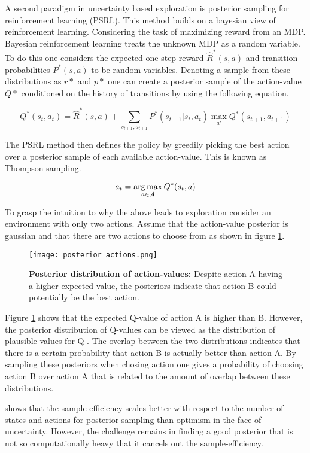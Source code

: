 A second paradigm in uncertainty based exploration is posterior sampling for reinforcement learning (PSRL). This method builds on a bayesian view of reinforcement learning. Considering the task of maximizing reward from an MDP. Bayesian reinforcement learning treats the unknown MDP as a random variable. To do this one considers the expected one-step reward $\hat{R}^*(s,a)$ and transition probabilities $P^*(s,a)$ to be random variables. Denoting a sample from these distributions as $r*$ and $p*$ one can create a posterior sample of the action-value $Q*$ conditioned on the history of transitions by using the following equation. 

\begin{equation}
 \label{eq:bayesian_bellman}
 Q^*(s_t,a_t) = \hat{R}^*(s,a) + \sum_{s_{t+1}, a_{t+1}}P^*(s_{t+1}|s_t,a_t)\max_{a'}Q^*(s_{t+1}, a_{t+1})
\end{equation}

The PSRL method then defines the policy by greedily picking the best action over a posterior sample of each available action-value. This is known as Thompson sampling. \citep{strens_2000}\citep{osband_2016}

\begin{equation}
a_t = \operatorname*{arg\,max}_{a\in\mathcal{A}} Q^*(s_t,a)
\end{equation}

To grasp the intuition to why the above leads to exploration consider an environment with only two actions. Assume that the action-value posterior is gaussian and that there are two actions to choose from as shown in figure \ref{fig:posterior-qvalues}.
 
\begin{figure}[H]
\centering
\texttt{[image: posterior\_actions.png]}
\captionsetup{width=.7\linewidth}
\caption{\textbf{Posterior distribution of action-values:} Despite action A having a higher expected value, the posteriors indicate that action B could potentially be the best action.}
\label{fig:posterior-qvalues}
\end{figure}


Figure \ref{fig:posterior-qvalues} shows that the expected Q-value of action A is higher than B. However, the posterior distribution of Q-values can be viewed as the distribution of plausible values for Q \citep{osband_2016}. The overlap between the two distributions indicates that there is a certain probability that action B is actually better than action A. By sampling these posteriors when chosing action one gives a probability of choosing action B over action A that is related to the amount of overlap between these distributions.

\cite{osband_2016} shows that the sample-efficiency scales better with respect to the number of states and actions for posterior sampling than optimism in the face of uncertainty. However, the challenge remains in finding a good posterior that is not so computationally heavy that it cancels out the sample-efficiency.

\cleardoublepage